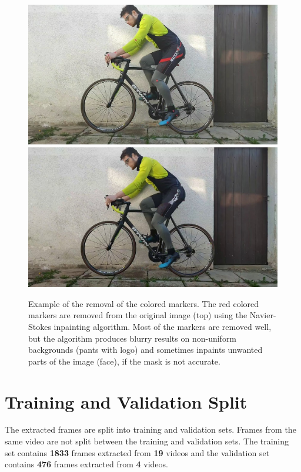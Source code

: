 \begin{figure}

    \centering
    \includegraphics[width=1\linewidth]{obrazky-figures/inpainting_original.jpg}
    \includegraphics[width=1\linewidth]{obrazky-figures/inpainting.jpg}
    \caption{Example of the removal of the colored markers. The red colored markers are removed from the original image (top) using the Navier-Stokes inpainting algorithm. Most of the markers are removed well, but the algorithm produces blurry results on non-uniform backgrounds (pants with logo) and sometimes inpaints unwanted parts of the image (face), if the mask is not accurate.}
    \label{fig:inpainting}
\end{figure}


\section{Training and Validation Split}
\label{evaluation_dataset}
The extracted frames are split into training and validation sets. Frames from the same video are not split between the training and validation sets. The training set contains \textbf{1833} frames extracted from \textbf{19} videos and the validation set contains \textbf{476} frames extracted from \textbf{4} videos.





